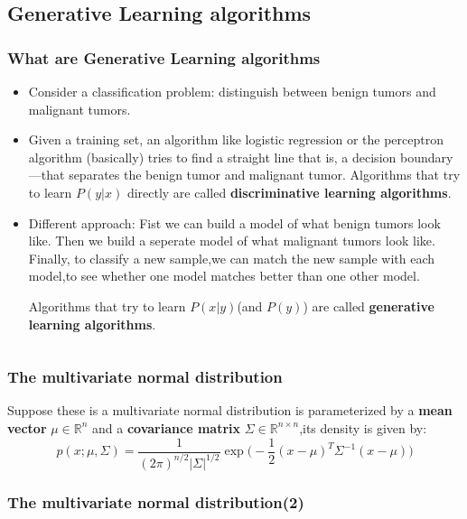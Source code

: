 \documentclass[slidestop,compress,mathserif]{beamer}
\begin{document}
    \subsection{Generative Learning algorithms}
    \begin{frame}[shrink]
        \frametitle{What are Generative Learning algorithms}
        \begin{itemize}
          \item Consider a classification problem: distinguish between benign tumors and malignant tumors.
          \item Given a training set, an algorithm like logistic regression or
              the perceptron algorithm (basically) tries to find a straight line that is, a decision boundary—that separates the benign tumor and malignant tumor.
			  Algorithms that try to learn $P(y|x)$ directly are called \textbf{discriminative learning algorithms}.
          \item Different approach: Fist we can build a model of what benign tumors look like. Then we build a seperate model of what malignant tumors look like. Finally, to classify a new sample,we can match the new sample with each model,to see whether one model matches better than one other model.

              Algorithms that try to learn $P(x|y)$(and $P(y)$) are called \textbf{generative learning algorithms}.
              
        \end{itemize}
        $$$$
    \end{frame}
    \begin{frame}
        \frametitle{The multivariate normal distribution}
        Suppose these is a multivariate normal distribution is parameterized by a \textbf{mean vector} $\mu \in \mathbb{R}^n$ and a \textbf{covariance matrix} $\Sigma \in \mathbb{R}^{n\times n}$,its density is given by:
        $$p(x;\mu,\Sigma)=\frac{1}{(2\pi)^{n/2}|\Sigma|^{1/2}}\exp\bigg(-\frac{1}{2}(x-\mu)^T\Sigma^{-1}(x-\mu)\bigg)$$
        \begin{figure}
        \end{figure}
    \end{frame}
    \begin{frame}
        \frametitle{The multivariate normal distribution(2)}
        \begin{figure}
        \end{figure}
        \begin{figure}
        \end{figure}
    \end{frame}
\end{document}
